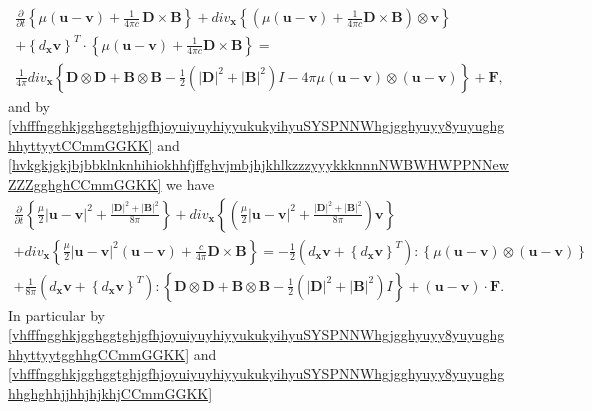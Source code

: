 \documentclass{article}
\theoremstyle{definition}
\theoremstyle{remark}
\renewcommand{\vec}[1]{\mathbf{#1}}
\newcommand{\er}{\eqref}
\newcommand{\er}{\eqref}
\begin{document}
\begin{multline}\label{vhfffngghkjgghggtghjgfhjoyuiyuyhiyyukukyihyuSYSPNNWhgjgghyuyy8yuyughghhghghhjjhhjhjkhjCCmmGGKK}
\frac{\partial}{\partial t}\left\{ \mu \left(\vec u-\vec v\right)
+\frac{1}{4\pi c}\,\vec D\times \vec B\right\}+ div_{\vec
x}\left\{\left(\mu \left(\vec u-\vec v\right)+\frac{1}{4\pi c}\vec
D\times \vec B\right)\otimes \vec v\right\}
\\+\left\{d_{\vec x}\vec v\right\}^T\cdot\left\{\mu\left(\vec u-\vec v\right)
+\frac{1}{4\pi c}\vec D\times \vec B\right\}=\\
\frac{1}{4\pi}div_\vec x\left\{\vec D\otimes \vec D+\vec B\otimes
\vec B-\frac{1}{2}\left(|\vec D|^2+|\vec B|^2\right)I-4\pi\mu
\left(\vec u-\vec v\right)\otimes(\vec u-\vec v)\right\}+\vec F,
\end{multline}
and by
\er{vhfffngghkjgghggtghjgfhjoyuiyuyhiyyukukyihyuSYSPNNWhgjgghyuyy8yuyughghhyttyytCCmmGGKK}
and
\er{hvkgkjgkjbjbbklnknhihiokhhfjffghvjmbjhjkhlkzzzyyykkknnnNWBWHWPPNNewZZZgghghCCmmGGKK}
we have
\begin{multline}\label{vhfffngghkjgghggtghjgfhjoyuiyuyhiyyukukyihyuSYSPNNWhgjgghyuyy8yuyughghhyttyytgghhgCCmmGGKK}
\frac{\partial}{\partial t}\left\{\frac{\mu}{2}\left|\vec u-\vec
v\right|^2+\frac{|\vec D|^2+|\vec B|^2}{8\pi}\right\}+div_{\vec
x}\left\{\left(\frac{\mu}{2}\left|\vec u-\vec v\right|^2+\frac{|\vec
D|^2+|\vec B|^2}{8\pi}\right)\vec v\right\}\\+div_{\vec
x}\left\{\frac{\mu}{2}\left|\vec u-\vec v\right|^2(\vec u-\vec
v)+\frac{c}{4\pi}\vec D\times \vec B\right\}=
-\frac{1}{2}\left(d_{\vec x}\vec v+\left\{d_{\vec x}\vec
v\right\}^T\right):\left\{\mu\left(\vec u-\vec v\right)\otimes
\left(\vec u-\vec v\right)\right\}\\+\frac{1}{8\pi}\left(d_{\vec
x}\vec v+\left\{d_{\vec x}\vec v\right\}^T\right):\left\{\vec
D\otimes \vec D+\vec B\otimes \vec B-\frac{1}{2}\left(|\vec
D|^2+|\vec B|^2\right)I
\right\}
+(\vec u-\vec v)\cdot\vec F.
\end{multline}
In particular by
\er{vhfffngghkjgghggtghjgfhjoyuiyuyhiyyukukyihyuSYSPNNWhgjgghyuyy8yuyughghhyttyytgghhgCCmmGGKK}
and
\er{vhfffngghkjgghggtghjgfhjoyuiyuyhiyyukukyihyuSYSPNNWhgjgghyuyy8yuyughghhghghhjjhhjhjkhjCCmmGGKK}
\end{document}
